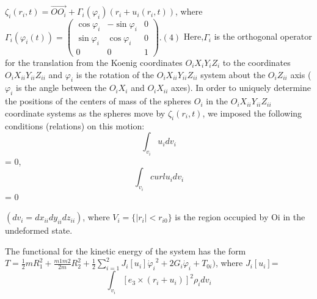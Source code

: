 \documentclass[12pt]{article}
\begin{document}
\begin{multicols}{2}
${\zeta_i}({r_i},t) = \vec{O{O_i}} + {\Gamma_i}({\varphi_i})({r_i}+{u_i}({r_i},t))$,
where
$ {\Gamma_i}({\varphi_i}(t)) =
 \begin{pmatrix} 
\cos{\varphi_i} & -\sin{\varphi_i}  & 0\\
\sin{\varphi_i} & \cos {\varphi_i} & 0\\
0 & 0 & 1
\end{pmatrix}
.(4)$
Here,${\Gamma_i}$ is the orthogonal operator for the translation
from the Koenig coordinates ${O_i}{X_i}{Y_i}{Z_i}$ to the
coordinates ${O_i}{X_{ii}}{Y_{ii}}{Z_{ii}}$ and ${\varphi_i}$ is the rotation of the
${O_i}{X_{ii}}{Y_{ii}}{Z_{ii}}$ system about the ${O_i}{Z_{ii}}$ axis (${\varphi_i}$ is the
angle between the ${O_i}{X_i}$ and ${O_i}{X_{ii}}$ axes).
In order to uniquely determine the positions of the
centers of mass of the spheres ${O_i}$ in the ${O_i}{X_{ii}}{Y_{ii}}{Z_{ii}}$
coordinate systems as the spheres move by ${\zeta_i}({r_i}, t)$,
we imposed the following conditions (relations) on
this motion:
$$\int_{v_i} {u_i}d{v_i}$$ = 0,
$$\int_{v_i} curl{u_i}d{v_i}$$ = 0

$(d{v_i} = d{x_{ii}}d{y_{ii}}d{z_{ii}})$,
where ${V_i} = \{|{r_i}| < {r_{i0}} \}$ is the region occupied by Oi
in the undeformed state.
\end{multicols}

\pagebreak
\begin{multicols}{2}
The functional for the kinetic energy of the system
has the form
$T = \frac{1}{2}m{R^2_1} + \frac{m1m2}{2m}{R^2_2} + \frac{1}{2}\sum_{i=1}^{2}{J_i}[{u_i}]{\dot{\varphi}_i}^2 + 2{G_i}{\dot{\varphi}_i}+{T_{0i}})$,
where
${J_i}[{u_i}] $= $$\int_{v_i} [{e_3}\times ({r_i} + {u_i})]^2 {\rho_i}d{v_i}$$
\end{multicols}

\thispagestyle{fancy}
\end{document}
